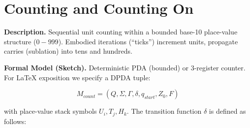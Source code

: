 \documentclass[12pt]{book}
\begin{document}
\section{Counting and Counting On}\label{counting-and-counting-on}

\textbf{Description.} Sequential unit counting within a bounded base-10
place-value structure (\(0-999\)). Embodied iterations (``ticks'')
increment units, propagate carries (sublation) into tens and hundreds.

\textbf{Formal Model (Sketch).} Deterministic PDA (bounded) or
3-register counter. For LaTeX exposition we specify a DPDA tuple:

\[M_{count} = (Q, \Sigma, \Gamma, \delta, q_{start}, Z_0, F)\]

with place-value stack symbols \(U_i, T_j, H_k\). The transition
function \(\delta\) is defined as follows:
\end{document}
